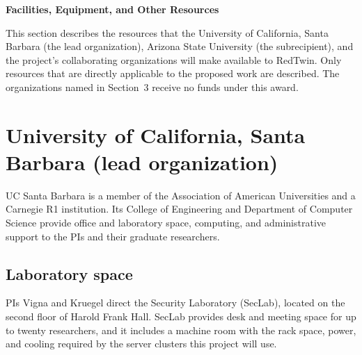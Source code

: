 \documentclass[11pt,letterpaper]{article}
\newcommand{\sysname}{RedTwin\xspace}
\begin{document}
\begin{center}
  {\large\bfseries Facilities, Equipment, and Other Resources}
\end{center}

\vspace{0.3em}

This section describes the resources that the University of California, Santa
Barbara (the lead organization), Arizona State University (the subrecipient),
and the project's collaborating organizations will make available to
\sysname. Only resources that are directly applicable to the proposed work are
described. The organizations named in Section~3 receive no funds under this
award.

\section{University of California, Santa Barbara (lead organization)}

UC Santa Barbara is a member of the Association of American Universities and a
Carnegie R1 institution. Its College of Engineering and Department of Computer
Science provide office and laboratory space, computing, and administrative
support to the PIs and their graduate researchers.

\subsection{Laboratory space}
PIs Vigna and Kruegel direct the Security Laboratory (SecLab), located on the
second floor of Harold Frank Hall. SecLab provides desk and meeting space for
up to twenty researchers, and it includes a machine room with the rack space,
power, and cooling required by the server clusters this project will use.
\end{document}
